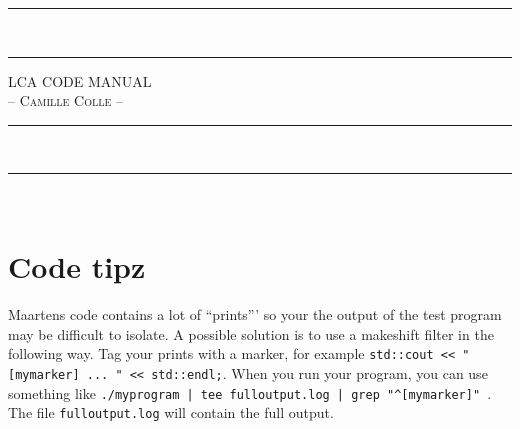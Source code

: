 \documentclass[10pt]{article}
\begin{document}
\rule{\textwidth}{2pt} \\ [-0.8\baselineskip]
\rule{\textwidth}{1pt}
\begin{center}
{\Huge \textsc{LCA CODE MANUAL}} \\
\vspace{10pt}
\textsc{ -- Camille Colle -- }
\end{center}
\rule{\textwidth}{1pt} \\ [-0.75\baselineskip]
\rule{\textwidth}{2pt} \\ [2\baselineskip]

\tableofcontents

\section{Code tipz}
Maartens code contains a lot of ``prints''' so your the output of the test program may be difficult to isolate.
A possible solution is to use a makeshift filter in the following way. Tag your prints with a marker, for example \texttt{std::cout << "[mymarker] ... " << std::endl;}. When you run your program, you can use something like \texttt{./myprogram | tee fulloutput.log | grep "\textasciicircum[mymarker]" }.
The file \texttt{fulloutput.log} will contain the full output.
\end{document}

